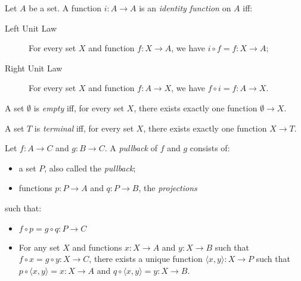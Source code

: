 \begin{df}
  Let $A$ be a set. A function $i : A \rightarrow A$ is an \emph{identity function} on $A$ iff:
\begin{description}
  \item[Left Unit Law]
  For every set $X$ and function $f : X \rightarrow A$, we have $i \circ f = f : X \rightarrow A$;
  \item[Right Unit Law]
  For every set $X$ and function $f : A \rightarrow X$, we have $f \circ i = f : A \rightarrow X$.
\end{description}
\end{df}

\begin{df}
  A set $\emptyset$ is \emph{empty} iff, for every set $X$, there exists exactly one function $\emptyset \rightarrow X$.
\end{df}

\begin{df}
  A set $T$ is \emph{terminal} iff, for every set $X$, there exists exactly one function $X \rightarrow T$.
\end{df}

\begin{df}[Pullback]
  Let $f : A \rightarrow C$ and $g : B \rightarrow C$. A \emph{pullback} of $f$ and $g$ consists of:
  \begin{itemize}
    \item a set $P$, also called the \emph{pullback};
    \item functions $p : P \rightarrow A$ and $q : P \rightarrow B$, the \emph{projections}
  \end{itemize}
  such that:
  \begin{itemize}
    \item $f \circ p = g \circ q : P \rightarrow C$
    \item For any set $X$ and functions $x : X \rightarrow A$ and $y : X \rightarrow B$ such that $f \circ x = g \circ y : X \rightarrow C$, there exists a unique function
    $\langle x, y \rangle : X \rightarrow P$ such that $p \circ \langle x, y \rangle = x : X \rightarrow A$ and $q \circ \langle x,y \rangle = y : X \rightarrow B$.
  \end{itemize}
\end{df}

